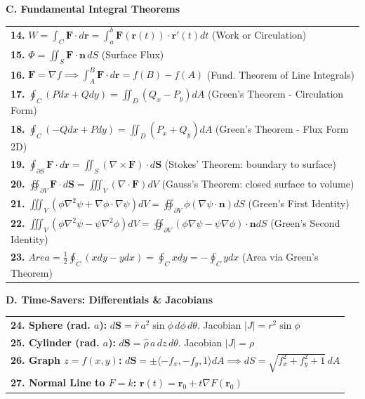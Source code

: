\documentclass[10pt, landscape, twocolumn]{article}
\begin{document}
\newpage
{\color{themeblue}\normalsize\bfseries C. Fundamental Integral Theorems} \par
\vspace{-0.2em}
\begin{tabularx}{\linewidth}{|X|}
\hline
\textbf{14.} $W = \int_C \mathbf{F} \cdot d\mathbf{r} = \int_a^b \mathbf{F}(\mathbf{r}(t)) \cdot \mathbf{r}'(t) dt$ (Work or Circulation) \\
\textbf{15.} $\Phi = \iint_S \mathbf{F} \cdot \mathbf{n} \, dS$ (Surface Flux) \\
\textbf{16.} $\mathbf{F} = \nabla f \implies \int_A^B \mathbf{F} \cdot d\mathbf{r} = f(B) - f(A)$ (Fund. Theorem of Line Integrals) \\
\textbf{17.} $\oint_C (P dx + Q dy) = \iint_D (Q_x - P_y) dA$ (Green's Theorem - Circulation Form) \\
\textbf{18.} $\oint_C (-Q dx + P dy) = \iint_D (P_x + Q_y) dA$ (Green's Theorem - Flux Form 2D) \\
\textbf{19.} $\oint_{\partial S} \mathbf{F} \cdot d\mathbf{r} = \iint_S (\nabla \times \mathbf{F}) \cdot d\mathbf{S}$ (Stokes' Theorem: boundary to surface) \\
\textbf{20.} $\oiint_{\partial V} \mathbf{F} \cdot d\mathbf{S} = \iiint_V (\nabla \cdot \mathbf{F}) dV$ (Gauss's Theorem: closed surface to volume) \\
\textbf{21.} $\iiint_V (\phi\nabla^2\psi + \nabla\phi\cdot\nabla\psi)dV = \oiint_{\partial V} \phi(\nabla\psi\cdot\mathbf{n})dS$ (Green's First Identity) \\
\textbf{22.} $\iiint_V (\phi\nabla^2\psi - \psi\nabla^2\phi)dV = \oiint_{\partial V} (\phi\nabla\psi - \psi\nabla\phi)\cdot\mathbf{n} dS$ (Green's Second Identity) \\
\textbf{23.} $Area = \frac{1}{2} \oint_C (x dy - y dx) = \oint_C x dy = -\oint_C y dx$ (Area via Green's Theorem) \\
\hline
\end{tabularx}

\vspace{0.6em}
{\color{themeblue}\normalsize\bfseries D. Time-Savers: Differentials \& Jacobians} \par
\vspace{-0.2em}
\begin{tabularx}{\linewidth}{|X|}
\hline
\textbf{24. Sphere (rad. $a$):} $d\mathbf{S} = \hat{r} \, a^2 \sin\phi \, d\phi \, d\theta$. Jacobian $|J| = r^2\sin\phi$ \\
\textbf{25. Cylinder (rad. $a$):} $d\mathbf{S} = \hat{\rho} \, a \, dz \, d\theta$. Jacobian $|J| = \rho$ \\
\textbf{26. Graph $z = f(x,y)$:} $d\mathbf{S} = \pm \langle -f_x, -f_y, 1 \rangle dA \implies dS = \sqrt{f_x^2 + f_y^2 + 1} \, dA$ \\
\textbf{27. Normal Line to $F=k$:} $\mathbf{r}(t) = \mathbf{r}_0 + t\nabla F(\mathbf{r}_0)$ \\
\hline
\end{tabularx}
\end{document}
